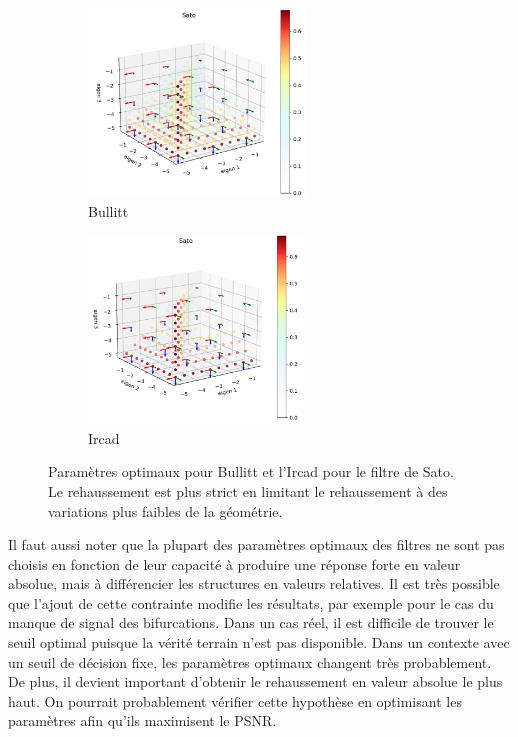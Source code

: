 \begin{figure}[H]

  \begin{subfigure}[t]{0.45\textwidth}
    \includegraphics[height=5cm]{Images/Bullitt_Sato_BP.png}
    \caption{Bullitt}
  \end{subfigure}
  \begin{subfigure}[t]{0.45\textwidth}
    \includegraphics[height=5cm]{Images/Ircad_Sato_BP.png}
    \caption{Ircad}
  \end{subfigure}

  \label{fig:exemple_geometry_Sato}
  \caption{Paramètres optimaux pour Bullitt et l'Ircad pour le filtre de Sato. Le rehaussement est plus strict en limitant le rehaussement à des variations plus faibles de la géométrie.}
\end{figure}

Il faut aussi noter que la plupart des paramètres optimaux des filtres ne sont pas choisis en fonction de leur capacité à produire une réponse forte en valeur absolue, mais à différencier les structures en valeurs relatives. Il est très possible que l'ajout de cette contrainte modifie les résultats, par exemple pour le cas du manque de signal des bifurcations.
Dans un cas réel, il est difficile de trouver le seuil optimal puisque la vérité terrain n'est pas disponible. Dans un contexte avec un seuil de décision fixe, les paramètres optimaux changent très probablement. De plus, il devient important d'obtenir le rehaussement en valeur absolue le plus haut. On pourrait probablement vérifier cette hypothèse en optimisant les paramètres afin qu'ils maximisent le PSNR.

